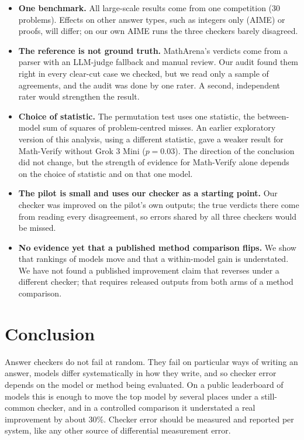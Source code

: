\documentclass[11pt]{article}
\begin{document}
\begin{itemize}
  \item \textbf{One benchmark.} All large-scale results come from one competition (30 problems). Effects on other answer types, such as integers only (AIME) or proofs, will differ; on our own AIME runs the three checkers barely disagreed.
  \item \textbf{The reference is not ground truth.} MathArena's verdicts come from a parser with an LLM-judge fallback and manual review. Our audit found them right in every clear-cut case we checked, but we read only a sample of agreements, and the audit was done by one rater. A second, independent rater would strengthen the result.
  \item \textbf{Choice of statistic.} The permutation test uses one statistic, the between-model sum of squares of problem-centred misses. An earlier exploratory version of this analysis, using a different statistic, gave a weaker result for Math-Verify without Grok 3 Mini ($p=0.03$). The direction of the conclusion did not change, but the strength of evidence for Math-Verify alone depends on the choice of statistic and on that one model.
  \item \textbf{The pilot is small and uses our checker as a starting point.} Our checker was improved on the pilot's own outputs; the true verdicts there come from reading every disagreement, so errors shared by all three checkers would be missed.
  \item \textbf{No evidence yet that a published method comparison flips.} We show that rankings of models move and that a within-model gain is understated. We have not found a published improvement claim that reverses under a different checker; that requires released outputs from both arms of a method comparison.
\end{itemize}

\section{Conclusion}

Answer checkers do not fail at random. They fail on particular ways of writing an answer, models differ systematically in how they write, and so checker error depends on the model or method being evaluated. On a public leaderboard of \maModels{} models this is enough to move the top model by several places under a still-common checker, and in a controlled comparison it understated a real improvement by about 30\%. Checker error should be measured and reported per system, like any other source of differential measurement error.
\end{document}
